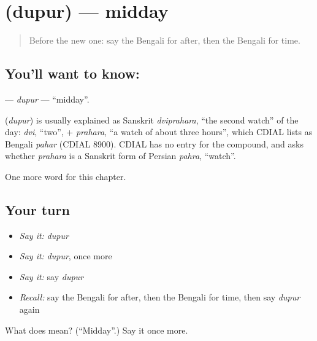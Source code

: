 \section[\texorpdfstring{\bn{দুপুর} (dupur)}{দুপুর (dupur)}]{ (dupur) — midday}

\label{lesson:BN-C80-dupur}



\begin{quote}
Before the new one: say the Bengali for after, then the Bengali for time.
\end{quote}

\subsection*{You'll want to know: }
\textbf{} — \emph{dupur} — \textquotedblleft{}midday\textquotedblright{}.

\begin{cousinweb}
\textbf{} (\emph{dupur}) is usually explained as Sanskrit \emph{dviprahara}, \textquotedblleft{}the second watch\textquotedblright{} of the day: \emph{dvi}, \textquotedblleft{}two\textquotedblright{}, + \emph{prahara}, \textquotedblleft{}a watch of about three hours\textquotedblright{}, which CDIAL lists as Bengali \emph{pahar} (CDIAL 8900). CDIAL has no entry for the compound, and asks whether \emph{prahara} is a Sanskrit form of Persian \emph{pahra}, \textquotedblleft{}watch\textquotedblright{}.
\end{cousinweb}

\begin{grammarlens}[title={What you've built}]
One more word for this chapter.
\end{grammarlens}

\subsection*{Your turn}
\begin{itemize}
\raggedright
  \item \emph{Say it:} \emph{dupur}
  \item \emph{Say it:} \emph{dupur}, once more
  \item \emph{Say it:} say \emph{dupur}
  \item \emph{Recall:} say the Bengali for after, then the Bengali for time, then say \emph{dupur} again
\end{itemize}

\begin{tcolorbox}[breakable,colback=teal!4,colframe=teal!35!black,title={Before you move on}]
What does  mean? (\textquotedblleft{}Midday\textquotedblright{}.) Say it once more.
\end{tcolorbox}

